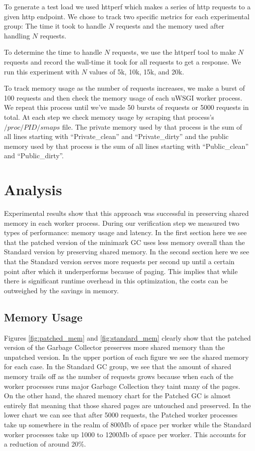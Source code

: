 \documentclass{article}
\begin{document}
To generate a test load we used httperf which makes a series of http requests to a given http endpoint.  We chose to track two specific metrics for each experimental group: The time it took to handle $N$ requests and the memory used after handling $N$ requests.

To determine the time to handle $N$ requests, we use the httperf tool to make $N$ requests and record the wall-time it took for all requests to get a response.  We run this experiment with $N$ values of 5k, 10k, 15k, and 20k.  

To track memory usage as the number of requests increases, we make a burst of 100 requests and then check the memory usage of each uWSGI worker process.  We repeat this process until we've made 50 bursts of requests or 5000 requests in total.  At each step we check memory usage by scraping that process's $/proc/PID/smaps$ file.  The private memory used by that process is the sum of all lines starting with ``Private\_clean'' and ``Private\_dirty'' and the public memory used by that process is the sum of all lines starting with ``Public\_clean'' and ``Public\_dirty''.  

\section{Analysis}\label{sec:analysis}

Experimental results show that this approach was successful in preserving shared memory in each worker process.  During our verification step we measured two types of performance:  memory usage and latency.  In the first section here we see that the patched version of the minimark GC uses less memory overall than the Standard version by preserving shared memory.  In the second section here we see that the Standard version serves more requests per second up until a certain point after which it underperforms because of paging.  This implies that while there is significant runtime overhead in this optimization, the costs can be outweighed by the savings in memory.  

\subsection{Memory Usage}

Figures \ref{fig:patched_mem} and \ref{fig:standard_mem} clearly show that the patched version of the Garbage Collector preserves more shared memory than the unpatched version.  In the upper portion of each figure we see the shared memory for each case.  In the Standard GC group, we see that the amount of shared memory trails off as the number of requests grows because when each of the worker processes runs major Garbage Collection they taint many of the pages.  On the other hand, the shared memory chart for the Patched GC is almost entirely flat meaning that those shared pages are untouched and preserved.  In the lower chart we can see that after 5000 requests, the Patched worker processes take up somewhere in the realm of 800Mb of space per worker while the Standard worker processes take up 1000 to 1200Mb of space per worker.  This accounts for a reduction of around 20\%.
\end{document}
